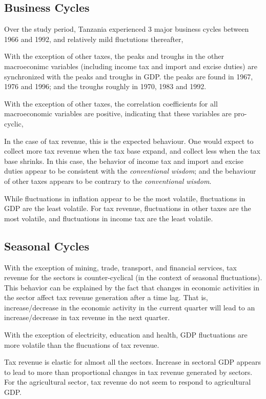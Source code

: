 \documentclass[12pt,a4paper,final]{article}
\begin{document}
\subsection{Business Cycles}
\begin{compactenum}[(i)]
\item Over the study period, Tanzania experienced 3 major business cycles between 1966 and 1992, and relatively mild fluctutions thereafter,
\item  With the exception of other taxes, the peaks and troughs in the other macroeconimc variables (including income tax and import and excise duties) are synchronized with the peaks and troughs in GDP. the peaks are found in 1967, 1976 and 1996; and the troughs roughly in 1970, 1983 and 1992.
\item  With the exception of other taxes, the correlation coefficients for all macroeconomic variables are positive, indicating that these variables are pro-cyclic,
\item In the case of tax revenue, this is the expected behaviour. One would expect to collect more tax revenue when the tax base expand, and collect less when the tax base shrinks. In this case, the behavior of income tax and import and excise duties appear to be consistent with the \textit{conventional wisdom}; and the behaviour of other taxes appears to be contrary to the \textit{conventional wisdom}.
\item While fluctuations in inflation appear to be the most volatile, fluctuations in GDP are the least volatile.  For tax revenue, fluctuations in other taxes are the most volatile, and fluctuations in income tax are the least volatile. 
\end{compactenum}

\subsection{Seasonal Cycles}
\begin{compactenum}[(i)]
\item With the exception of mining, trade, transport, and financial services, tax revenue for the sectors is counter-cyclical (in the context of seasonal fluctuations).  This behavior can be explained by the fact that changes in economic activities in the sector affect tax revenue generation after a time lag. That is, increase/decrease in the economic activity in the current quarter will lead to an increase/decrease in tax revenue in the next quarter.
\item  With the exception of electricity, education and health, GDP fluctuations are more volatile than the flucuations of tax revenue. 
\item Tax revenue is elastic for almost all the sectors. Increase in sectoral GDP appears to lead to more than proportional changes in tax revenue generated by sectors. For the agricultural sector, tax revenue do not seem to respond to agricultural GDP.
\end{compactenum}
\end{document}
